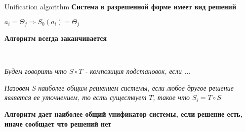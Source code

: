 \begin{para}{Unification algorithm}
\textbf{Система в разрешенной форме имеет вид решений}

$a_i = \Theta_j \Rightarrow S_0(a_i) = \Theta_j$

\textbf{Алгоритм всегда заканчивается}

~\

\textit{Будем говорить что $S \circ T$ - композиция подстановок, если ...}

\textit{Назовем S наиболее общим решением системы, если любое другое решение является ее уточнением, то есть существует $T$, такое что $S_i = T \circ S$}

\textbf{Алгоритм дает наиболее общий унификатор системы, если решение есть, иначе сообщает что решений нет}

\end{para}

